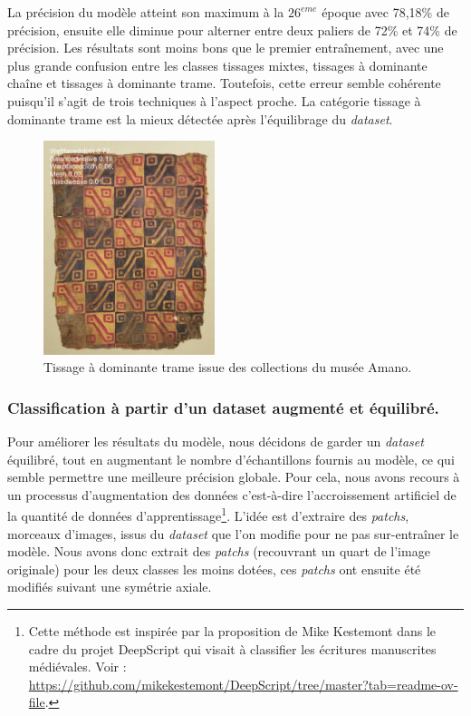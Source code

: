 La précision du modèle atteint son maximum à la $26^{eme}$ époque avec 78,18\% de précision, ensuite elle diminue pour alterner entre deux paliers de 72\% et 74\% de précision. Les résultats sont moins bons que le premier entraînement, avec une plus grande confusion entre les classes tissages mixtes, tissages à dominante chaîne et tissages à dominante trame. Toutefois, cette erreur semble cohérente puisqu'il s'agit de trois techniques à l'aspect proche. La catégorie tissage à dominante trame est la mieux détectée après l'équilibrage du \textit{dataset}.

\begin{figure}[!h]
	\begin{center}
		\includegraphics[width=5cm]{../images/AMANOweft2.png}
		\caption{Tissage à dominante trame issue des collections du musée Amano.}
	 \end{center}
\end{figure}

\subsubsection{Classification à partir d'un dataset augmenté et équilibré.}

Pour améliorer les résultats du modèle, nous décidons de garder un \textit{dataset} équilibré, tout en augmentant le nombre d'échantillons fournis au modèle, ce qui semble permettre une meilleure précision globale. Pour cela, nous avons recours à un processus d'augmentation des données c'est-à-dire l'accroissement artificiel de la quantité de données d'apprentissage\footnote{Cette méthode est inspirée par la proposition de Mike Kestemont dans le cadre du projet DeepScript qui visait à classifier les écritures manuscrites médiévales. Voir : \url{https://github.com/mikekestemont/DeepScript/tree/master?tab=readme-ov-file}.}. L'idée est d'extraire des \textit{patchs}, morceaux d'images, issus du \textit{dataset} que l'on modifie pour ne pas sur-entraîner le modèle. Nous avons donc extrait des \textit{patchs} (recouvrant un quart de l'image originale) pour les deux classes les moins dotées, ces \textit{patchs} ont ensuite été modifiés suivant une symétrie axiale.



